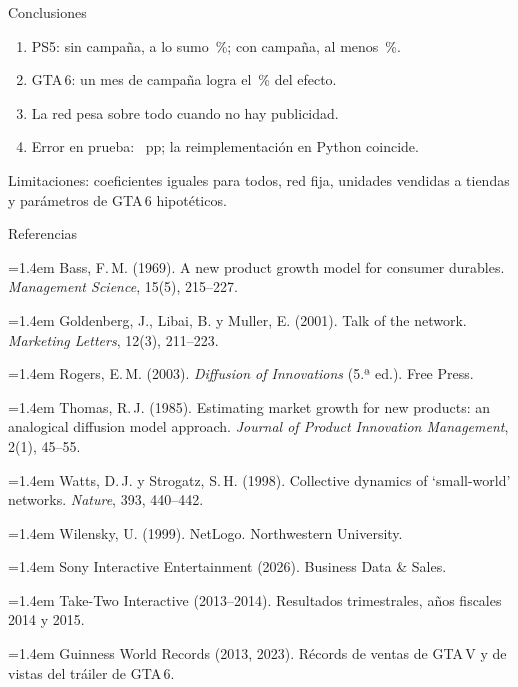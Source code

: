 \documentclass[aspectratio=169,11pt,notes=only]{beamer}
\newcommand{\nota}[1]{{\raggedright\footnotesize\color{secundario}#1\par}}
\newcommand{\referencia}[1]{\par\hangindent=1.4em\hangafter=1 #1\par}
\begin{document}
\begin{frame}{Conclusiones}
  \vskip2mm
  \begin{enumerate}
    \item PS5: sin campaña, a lo sumo \cifraPsSinMaxGlobal\,\%; con campaña, al menos \cifraPsConMin\,\%.
    \item GTA\,6: un mes de campaña logra el \cifraFraccionGtaDUno\,\% del efecto.
    \item La red pesa sobre todo cuando no hay publicidad.
    \item Error en prueba: \cifraAbmRmsePru\ pp; la reimplementación en Python coincide.
  \end{enumerate}
  \vskip5mm
  \nota{Limitaciones: coeficientes iguales para todos, red fija, unidades vendidas a tiendas y parámetros de GTA\,6 hipotéticos.}
\end{frame}

\begin{frame}{Referencias}
  \vskip0.5mm
  \raggedright\fontsize{8}{9.6}\selectfont
  \setlength{\parskip}{1.1mm}
  \referencia{Bass, F.\,M. (1969). A new product growth model for consumer durables. \textit{Management Science}, 15(5), 215--227.}
  \referencia{Goldenberg, J., Libai, B. y Muller, E. (2001). Talk of the network. \textit{Marketing Letters}, 12(3), 211--223.}
  \referencia{Rogers, E.\,M. (2003). \textit{Diffusion of Innovations} (5.ª ed.). Free Press.}
  \referencia{Thomas, R.\,J. (1985). Estimating market growth for new products: an analogical diffusion model approach. \textit{Journal of Product Innovation Management}, 2(1), 45--55.}
  \referencia{Watts, D.\,J. y Strogatz, S.\,H. (1998). Collective dynamics of `small-world' networks. \textit{Nature}, 393, 440--442.}
  \referencia{Wilensky, U. (1999). NetLogo. Northwestern University.}
  \referencia{Sony Interactive Entertainment (2026). Business Data \& Sales.}
  \referencia{Take-Two Interactive (2013--2014). Resultados trimestrales, años fiscales 2014 y 2015.}
  \referencia{Guinness World Records (2013, 2023). Récords de ventas de GTA\,V y de vistas del tráiler de GTA\,6.}
\end{frame}
\end{document}

